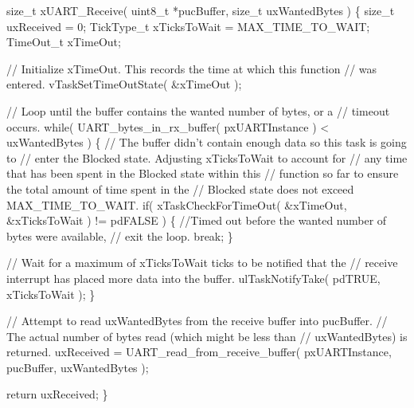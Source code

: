 \begin{DoxyPre}   size\_t xUART\_Receive( uint8\_t *pucBuffer, size\_t uxWantedBytes )
   \{
   size\_t uxReceived = 0;
   TickType\_t xTicksToWait = MAX\_TIME\_TO\_WAIT;
   TimeOut\_t xTimeOut;\end{DoxyPre}



\begin{DoxyPre}    // Initialize xTimeOut.  This records the time at which this function
    // was entered.
    vTaskSetTimeOutState( \&xTimeOut );\end{DoxyPre}



\begin{DoxyPre}    // Loop until the buffer contains the wanted number of bytes, or a
    // timeout occurs.
    while( UART\_bytes\_in\_rx\_buffer( pxUARTInstance ) < uxWantedBytes )
    \{
        // The buffer didn't contain enough data so this task is going to
        // enter the Blocked state. Adjusting xTicksToWait to account for
        // any time that has been spent in the Blocked state within this
        // function so far to ensure the total amount of time spent in the
        // Blocked state does not exceed MAX\_TIME\_TO\_WAIT.
        if( xTaskCheckForTimeOut( \&xTimeOut, \&xTicksToWait ) != pdFALSE )
        \{
            //Timed out before the wanted number of bytes were available,
            // exit the loop.
            break;
        \}\end{DoxyPre}



\begin{DoxyPre}        // Wait for a maximum of xTicksToWait ticks to be notified that the
        // receive interrupt has placed more data into the buffer.
        ulTaskNotifyTake( pdTRUE, xTicksToWait );
    \}\end{DoxyPre}



\begin{DoxyPre}    // Attempt to read uxWantedBytes from the receive buffer into pucBuffer.
    // The actual number of bytes read (which might be less than
    // uxWantedBytes) is returned.
    uxReceived = UART\_read\_from\_receive\_buffer( pxUARTInstance,
                                                pucBuffer,
                                                uxWantedBytes );\end{DoxyPre}



\begin{DoxyPre}    return uxReceived;
   \}
\end{DoxyPre}
 